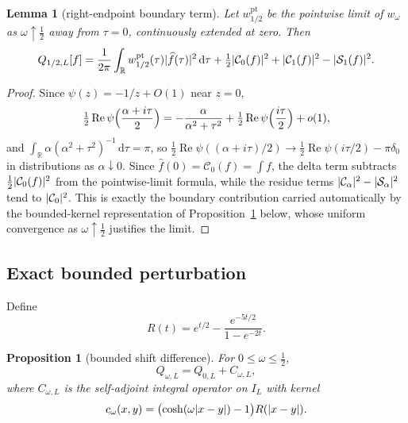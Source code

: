 \documentclass[11pt,a4paper]{article}
\newcommand{\R}{\mathbb R}
\renewcommand{\Re}{\operatorname{Re}}
\newcommand{\dd}{\,\mathrm d}
\newcommand{\Cc}{\mathcal C}
\newcommand{\Ss}{\mathcal S}
\newcommand{\pt}{\mathrm{pt}}
\DeclarePairedDelimiter{\abs}{\lvert}{\rvert}
\theoremstyle{plain}
\newtheorem{proposition}[theorem]{Proposition}
\newtheorem{lemma}[theorem]{Lemma}
\theoremstyle{definition}
\numberwithin{equation}{section}
\begin{document}
\begin{lemma}[right-endpoint boundary term]\label{lem:endpoint}
Let $w^{\pt}_{1/2}$ be the pointwise limit of $w_\omega$ as
$\omega\uparrow\tfrac12$ away from $\tau=0$, continuously extended at zero.
Then
\begin{equation}\label{eq:Q-endpoint}
Q_{1/2,L}[f]=\frac1{2\pi}\int_\R w^{\pt}_{1/2}(\tau)\abs{\widehat f(\tau)}^2\dd\tau
+\tfrac12\abs{\Cc_0(f)}^2+\abs{\Cc_1(f)}^2-\abs{\Ss_1(f)}^2 .
\end{equation}
\end{lemma}

\begin{proof}
Since $\psi(z)=-1/z+O(1)$ near $z=0$,
\[
\tfrac12\Re\psi\Bigl(\frac{\alpha+i\tau}2\Bigr)
=-\frac{\alpha}{\alpha^2+\tau^2}+\tfrac12\Re\psi\Bigl(\frac{i\tau}2\Bigr)+o(1),
\]
and $\int_\R\alpha(\alpha^2+\tau^2)^{-1}\dd\tau=\pi$, so
$\tfrac12\Re\psi((\alpha+i\tau)/2)\to\tfrac12\Re\psi(i\tau/2)-\pi\delta_0$
in distributions as $\alpha\downarrow0$. Since
$\widehat f(0)=\Cc_0(f)=\int f$, the delta term subtracts
$\tfrac12\abs{\Cc_0(f)}^2$ from the pointwise-limit formula, while the residue
terms $\abs{\Cc_\alpha}^2-\abs{\Ss_\alpha}^2$ tend to $\abs{\Cc_0}^2$. This is
exactly the boundary contribution carried automatically by the bounded-kernel
representation of Proposition~\ref{prop:bounded-difference} below, whose
uniform convergence as $\omega\uparrow\tfrac12$ justifies the limit.
\end{proof}

\subsection{Exact bounded perturbation}

Define
\begin{equation}\label{eq:R}
R(t)=e^{t/2}-\frac{e^{-5t/2}}{1-e^{-2t}} .
\end{equation}

\begin{proposition}[bounded shift difference]\label{prop:bounded-difference}
For $0\le\omega\le\tfrac12$,
\begin{equation}\label{eq:Q-decomp}
Q_{\omega,L}=Q_{0,L}+C_{\omega,L},
\end{equation}
where $C_{\omega,L}$ is the self-adjoint integral operator on $I_L$ with kernel
\begin{equation}\label{eq:c-kernel}
c_\omega(x,y)=\bigl(\cosh(\omega\abs{x-y})-1\bigr)R(\abs{x-y}) .
\end{equation}
\end{proposition}
\end{document}
